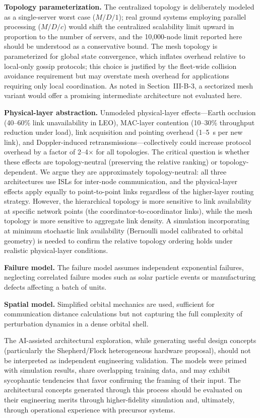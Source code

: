\documentclass[journal]{IEEEtran}
\begin{document}
\textbf{Topology parameterization.} The centralized topology is deliberately modeled as a single-server worst case ($M/D/1$); real ground systems employing parallel processing ($M/D/c$) would shift the centralized scalability limit upward in proportion to the number of servers, and the 10{,}000-node limit reported here should be understood as a conservative bound. The mesh topology is parameterized for global state convergence, which inflates overhead relative to local-only gossip protocols; this choice is justified by the fleet-wide collision avoidance requirement but may overstate mesh overhead for applications requiring only local coordination. As noted in Section~III-B-3, a sectorized mesh variant would offer a promising intermediate architecture not evaluated here.

\textbf{Physical-layer abstraction.} Unmodeled physical-layer effects---Earth occlusion (40--60\% link unavailability in LEO), MAC-layer contention (10--30\% throughput reduction under load), link acquisition and pointing overhead (1--5~s per new link), and Doppler-induced retransmissions---collectively could increase protocol overhead by a factor of 2--4$\times$ for all topologies. The critical question is whether these effects are topology-neutral (preserving the relative ranking) or topology-dependent. We argue they are approximately topology-neutral: all three architectures use ISLs for inter-node communication, and the physical-layer effects apply equally to point-to-point links regardless of the higher-layer routing strategy. However, the hierarchical topology is more sensitive to link availability at specific network points (the coordinator-to-coordinator links), while the mesh topology is more sensitive to aggregate link density. A simulation incorporating at minimum stochastic link availability (Bernoulli model calibrated to orbital geometry) is needed to confirm the relative topology ordering holds under realistic physical-layer conditions.

\textbf{Failure model.} The failure model assumes independent exponential failures, neglecting correlated failure modes such as solar particle events or manufacturing defects affecting a batch of units.

\textbf{Spatial model.} Simplified orbital mechanics are used, sufficient for communication distance calculations but not capturing the full complexity of perturbation dynamics in a dense orbital shell.

The AI-assisted architectural exploration, while generating useful design concepts (particularly the Shepherd/Flock heterogeneous hardware proposal), should not be interpreted as independent engineering validation. The models were primed with simulation results, share overlapping training data, and may exhibit sycophantic tendencies that favor confirming the framing of their input. The architectural concepts generated through this process should be evaluated on their engineering merits through higher-fidelity simulation and, ultimately, through operational experience with precursor systems.
\end{document}
